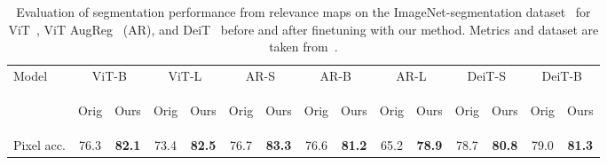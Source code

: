\documentclass{article}
\begin{document}
\begin{table}[t!]
\caption{Evaluation of segmentation performance from relevance maps on the ImageNet-segmentation dataset~\cite{Guillaumin2014ImageNetAW} for ViT~\cite{dosovitskiy2020image}, ViT AugReg~\cite{Steiner2021HowTT} (AR), and DeiT~\cite{Touvron2021TrainingDI} before and after finetuning with our method. Metrics and dataset are taken from~\cite{chefer2020transformer}.
    }
\begin{center}
\begin{tabular}{l@{~~~}c@{~}c@{~~~}c@{~}c@{~~~}c@{~}c@{~~~}c@{~}c@{~~~}c@{~}c@{~~~}c@{~}c@{~~~}c@{~}c@{}}
        \toprule
          \multirow{2}{*}{Model} & \multicolumn{2}{c}{ViT-B}&\multicolumn{2}{c}{ViT-L} & \multicolumn{2}{c}{AR-S} & \multicolumn{2}{c}{AR-B}& \multicolumn{2}{c}{AR-L} 
        & \multicolumn{2}{c}{DeiT-S}
        & \multicolumn{2}{c}{DeiT-B} 
         \\
        & \begin{small}Orig\end{small} & \begin{small}Ours\end{small}& \begin{small}Orig\end{small}  & \begin{small}Ours\end{small} &\begin{small}Orig\end{small}  & \begin{small}Ours\end{small} &\begin{small}Orig\end{small}  & \begin{small}Ours\end{small} &\begin{small}Orig\end{small}  & \begin{small}Ours\end{small} &\begin{small}Orig\end{small}  & \begin{small}Ours\end{small} &\begin{small}Orig\end{small}  & \begin{small}Ours\end{small}  \\
        \midrule
         \small{Pixel acc.} & 76.3 & \textbf{82.1} & 73.4 & \textbf{82.5} & 76.7 & \textbf{83.3} & 76.6 & \textbf{81.2} & 65.2 & \textbf{78.9} & 78.7 & \textbf{80.8} & 79.0 & \textbf{81.3} \\

\end{tabular}
\end{center}
\end{table}
\end{document}
